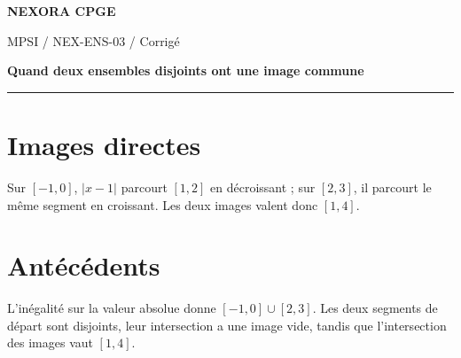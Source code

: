 \documentclass[11pt,a4paper]{article}
\begin{document}
{\small\bfseries\color{nexorablue} NEXORA CPGE}\par
{\small MPSI / NEX-ENS-03 / Corrigé}\par
{\LARGE\bfseries Quand deux ensembles disjoints ont une image commune}\par
\vspace{0.25em}\hrule\vspace{0.6em}

\section*{Images directes}
Sur $[-1,0]$, $|x-1|$ parcourt $[1,2]$ en décroissant ; sur $[2,3]$, il parcourt le même segment en croissant. Les deux images valent donc $[1,4]$.

\section*{Antécédents}
L’inégalité sur la valeur absolue donne $[-1,0]\cup[2,3]$. Les deux segments de départ sont disjoints, leur intersection a une image vide, tandis que l’intersection des images vaut $[1,4]$.
\end{document}
